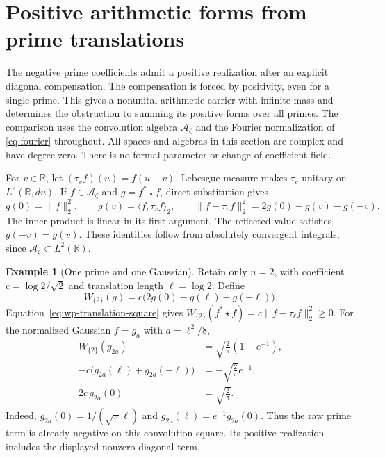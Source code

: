 \documentclass[11pt]{article}
\theoremstyle{definition}
\newtheorem{example}[theorem]{Example}
\theoremstyle{remark}
\numberwithin{equation}{section}
\newcommand{\cA}{\mathcal A}
\newcommand{\R}{\mathbb R}
\begin{document}
\section{Positive arithmetic forms from prime translations}
\label{sec:wp-prime-translations}

The negative prime coefficients admit a positive realization after an
explicit diagonal compensation.
The compensation is forced by positivity, even for a single prime.
This gives a nonunital arithmetic carrier with infinite mass and determines
the obstruction to summing its positive forms over all primes.
The comparison uses the convolution algebra $\cA_\zeta$ and the Fourier
normalization of \eqref{eq:fourier} throughout.
All spaces and algebras in this section are complex and have degree zero.
There is no formal parameter or change of coefficient field.

For $v\in\R$, let $(\tau_v f)(u)=f(u-v)$.
Lebesgue measure makes $\tau_v$ unitary on $L^2(\R,du)$.
If $f\in\cA_\zeta$ and $g=f^*\star f$, direct substitution gives
\begin{equation}
 g(0)=\|f\|_2^2,\qquad
 g(v)=\langle f,\tau_v f\rangle_2,\qquad
 \|f-\tau_v f\|_2^2=2g(0)-g(v)-g(-v).
 \label{eq:wp-translation-square}
\end{equation}
The inner product is linear in its first argument.
The reflected value satisfies $g(-v)=\overline{g(v)}$.
These identities follow from absolutely convergent integrals, since
$\cA_\zeta\subset L^2(\R)$.

\begin{example}[One prime and one Gaussian]
\label{ex:wp-prime-two}
Retain only $n=2$, with coefficient
$c=\log 2/\sqrt 2$ and translation length $\ell=\log 2$.
Define
\[
 W_{\{2\}}(g)=c\bigl(2g(0)-g(\ell)-g(-\ell)\bigr).
\]
Equation~\eqref{eq:wp-translation-square} gives
$W_{\{2\}}(f^*\star f)=c\|f-\tau_\ell f\|_2^2\geq0$.
For the normalized Gaussian $f=g_a$ with $a=\ell^2/8$,
\begin{equation}
 \begin{aligned}
 W_{\{2\}}(g_{2a})&=\sqrt{\frac2\pi}(1-e^{-1}),\\
 -c\bigl(g_{2a}(\ell)+g_{2a}(-\ell)\bigr)
 &=-\sqrt{\frac2\pi}e^{-1},\\
 2c\,g_{2a}(0)&=\sqrt{\frac2\pi}.
 \end{aligned}
 \label{eq:wp-prime-two-values}
\end{equation}
Indeed, $g_{2a}(0)=1/(\sqrt\pi\ell)$ and
$g_{2a}(\ell)=e^{-1}g_{2a}(0)$.
Thus the raw prime term is already negative on this convolution square.
Its positive realization includes the displayed nonzero diagonal term.
\end{example}
\end{document}
